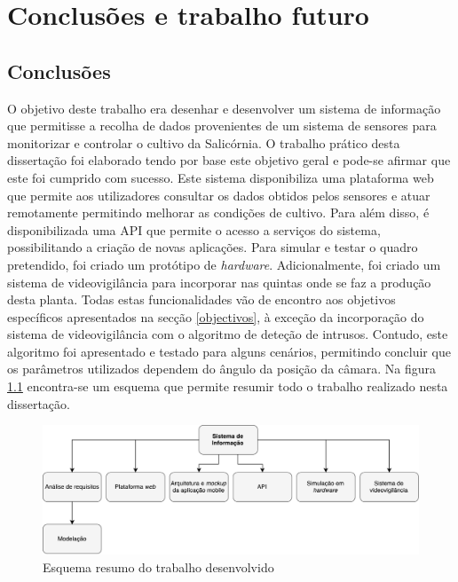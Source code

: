 \chapter{Conclusões e trabalho futuro}


\section{Conclusões}



O objetivo deste trabalho era desenhar e desenvolver um sistema de informação que permitisse a recolha de dados provenientes de um sistema de sensores para monitorizar e controlar o cultivo da Salicórnia. O trabalho prático desta dissertação foi elaborado tendo por base este objetivo geral e pode-se afirmar que este foi cumprido com sucesso. Este sistema disponibiliza uma plataforma web que permite aos utilizadores consultar os dados obtidos pelos sensores e atuar remotamente permitindo melhorar as condições de cultivo. Para além disso, é disponibilizada uma \ac{API} que permite o acesso a serviços do sistema, possibilitando a criação de novas aplicações. Para simular e testar o quadro pretendido, foi criado um protótipo de \textit{hardware}. Adicionalmente, foi criado um sistema de videovigilância para incorporar nas quintas onde se faz a produção desta planta. Todas estas funcionalidades vão de encontro aos objetivos específicos apresentados na secção \ref{objectivos}, à exceção da incorporação do sistema de videovigilância com o algoritmo de deteção de intrusos. Contudo, este algoritmo foi apresentado e testado para alguns cenários, permitindo concluir que os parâmetros utilizados dependem do ângulo da posição da câmara.  Na figura \ref{resumo} encontra-se um esquema que permite resumir todo o trabalho realizado nesta dissertação. 

\begin{figure}[h]
	\centering
	\includegraphics[width=0.68\linewidth]{esquemas/conclusaofinal.pdf}
	\caption{Esquema resumo do trabalho desenvolvido}
	\label{resumo}
\end{figure}



